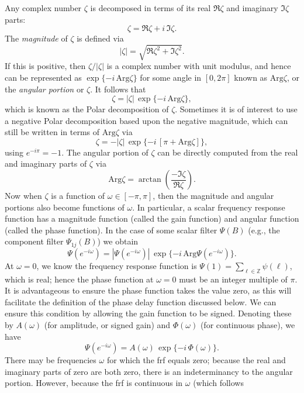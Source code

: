 \documentclass[a4paper]{book}
\def\ZZ{\mathbb Z}
\begin{document}
Any complex number $\zeta$ is decomposed in terms of its real $\Re \zeta$ and imaginary
 $\Im \zeta$ parts:
\[
 \zeta = \Re \zeta + i \, \Im \zeta.
\]
 The {\em magnitude} of $\zeta$ is defined via 
\[
  | \zeta | = \sqrt{ { \Re \zeta }^2 + { \Im \zeta }^2 }.
\]
 If this is positive, then $\zeta / |\zeta|$ is a complex number with unit modulus,
 and hence can be represented as $\exp \{ -i \, \mbox{Arg} \zeta \}$ for some angle
  in $[0, 2 \pi]$ known as $\mbox{Arg} \zeta$, or the {\em angular portion} or $\zeta$.
  It follows that
\[
  \zeta = | \zeta | \, \exp \{ -i \, \mbox{Arg} \zeta \},
\]
 which is known as the Polar decomposition of $\zeta$.  Sometimes it is of interest
 to use a negative Polar decomposition based upon the negative magnitude, which can
 still be written in terms of $\mbox{Arg} \zeta$ via
\[
  \zeta = - | \zeta| \, \exp \{ -i \, [ \pi +  \mbox{Arg} \zeta ] \},
\]
 using $e^{-i \pi} = -1$.  The angular portion of $\zeta$ can be directly computed
 from the real and imaginary parts of $\zeta$ via
\[
 \mbox{Arg} \zeta = \arctan \left( \frac{ -\Im \zeta }{ \Re \zeta} \right).
\]
 Now when $\zeta$ is a function of $\omega  \in [-\pi, \pi]$, then the magnitude and
 angular portions also become functions of $\omega $.   In particular, a scalar frequency 
 response function has a magnitude function (called the gain function) and 
 angular function (called the phase function).  In the case of some scalar filter 
 $\Psi (B)$ (e.g., the component filter $\Psi_{1j} (B)$) we obtain
\[
  \Psi  (e^{-i \omega }) = | \Psi  (e^{-i \omega })| \, 
   \exp \{ - i \, \mbox{Arg} \Psi (e^{-i \omega }) \}.
\]
  At $\omega  = 0$, we know the frequency response function is $\Psi (1) =
 \sum_{\ell \in \ZZ} \psi (\ell)$, which is real; hence the phase function at 
 $\omega  = 0$ must be an integer multiple of $\pi$.  It is advantageous to ensure
 the phase function takes the value zero, as this will facilitate the definition of
 the phase delay function discussed below.  We can ensure this condition by allowing
 the gain function to be signed.  Denoting these by $A(\omega )$ (for amplitude, or 
 signed gain) and $\Phi (\omega )$ (for continuous phase), we have
\begin{equation}
 \label{eq:frf-gain.and.phase}
  \Psi (e^{-i \omega }) = A(\omega ) \, \exp \{ - i \, \Phi (\omega ) \}.
\end{equation}
  There may be frequencies $\omega $ for which the frf equals zero; because the real
 and imaginary parts of zero are both zero, there is an indeterminancy to the
 angular portion.  However, because the frf is continuous in $\omega $ (which follows
\end{document}
